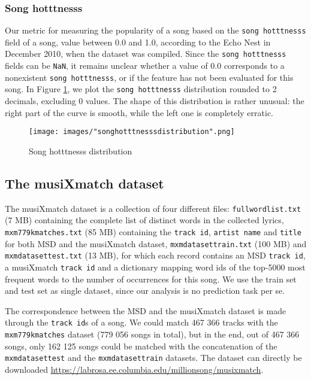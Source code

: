 \documentclass[10pt]{article}
\renewcommand\_{\textunderscore\allowbreak}
\begin{document}
\subsubsection{Song hotttnesss}
Our metric for measuring the popularity of a song based on the \texttt{song hotttnesss} field of a song, value between 0.0 and 1.0, according to the Echo Nest in December 2010, when the dataset was compiled.
Since the \texttt{song hotttnesss} fields can be \texttt{NaN}, it remains unclear whether a value of 0.0 corresponds to a nonexistent \texttt{song hotttnesss}, or if the feature has not been evaluated for this song.
In Figure \ref{fig:song_hotttnesss_distribution}, we plot the \texttt{song hotttnesss} distribution rounded to 2 decimals, excluding 0 values. 
The shape of this distribution is rather unusual: the right part of the curve is smooth, while the left one is completely erratic.
\begin{figure}[h!]
\centering
\captionsetup{width=1.0\textwidth}
\texttt{[image: images/"song\_hotttnesss\_distribution".png]}
\caption{Song hotttnesss distribution}
\label{fig:song_hotttnesss_distribution}
\end{figure}

\subsection{The musiXmatch dataset}
The musiXmatch dataset is a collection of four different files: 
\texttt{full\_word\_list.txt} (7 MB) containing the complete list of distinct words in the collected lyrics, \texttt{mxm\_779k\_matches.txt} (85 MB) containing the \texttt{track id}, \texttt{artist name} and \texttt{title} for both MSD and the musiXmatch dataset, \texttt{mxm\_dataset\_train.txt} (100 MB) and \texttt{mxm\_dataset\_test.txt} (13 MB), for which each record contains an MSD \texttt{track id}, a musiXmatch \texttt{track id} and a dictionary mapping word ids of the top-5000 most frequent words to the number of occurrences for this song.
We use the train set and test set as single dataset, since our analysis is no prediction task per se.

The correspondence between the MSD and the musiXmatch dataset is made through the \texttt{track id}s of a song.
We could match 467 366 tracks with the \texttt{mxm\_779k\_matches} dataset (779 056 songs in total), but in the end, out of 467 366 songs, only 162 125 songs could be matched with the concatenation of the \texttt{mxm\_dataset\_test} and the \texttt{mxm\_dataset\_train} datasets.
The dataset can directly be downloaded  \url{https://labrosa.ee.columbia.edu/millionsong/musixmatch}.
\end{document}
